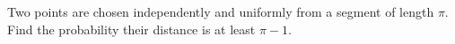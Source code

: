 Two points are chosen independently and uniformly from a segment of length $\pi$. Find the probability their distance is at least $\pi-1$.
